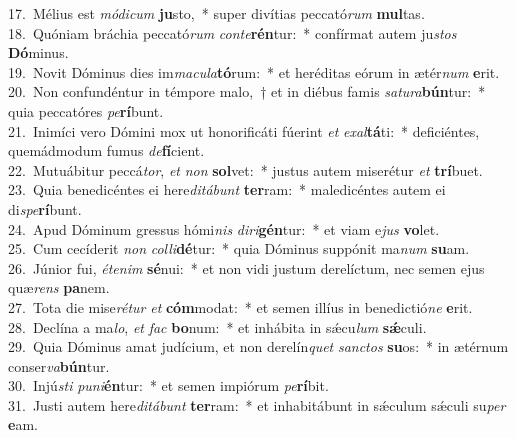 {17.~}Mélius est \textit{mó}\textit{di}\textit{cum} \textbf{ju}sto,~* super divítias peccató\textit{rum} \textbf{mul}tas.\\
{18.~}Quóniam bráchia peccató\textit{rum} \textit{con}\textit{te}\textbf{rén}tur:~* confírmat autem ju\textit{stos} \textbf{Dó}minus.\\
{19.~}Novit Dóminus dies im\textit{ma}\textit{cu}\textit{la}\textbf{tó}rum:~* et heréditas eórum in ætér\textit{num} \textbf{e}rit.\\
{20.~}Non confundéntur in témpore malo,~† et in diébus famis \textit{sa}\textit{tu}\textit{ra}\textbf{bún}tur:~* quia peccatóres \textit{pe}\textbf{rí}bunt.\\
{21.~}Inimíci vero Dómini mox ut honorificáti fúerint \textit{et} \textit{e}\textit{xal}\textbf{tá}ti:~* deficiéntes, quemádmodum fumus \textit{de}\textbf{fí}cient.\\
{22.~}Mutuábitur peccá\textit{tor}, \textit{et} \textit{non} \textbf{sol}vet:~* justus autem miserétur \textit{et} \textbf{trí}buet.\\
{23.~}Quia benedicéntes ei here\textit{di}\textit{tá}\textit{bunt} \textbf{ter}ram:~* maledicéntes autem ei di\textit{spe}\textbf{rí}bunt.\\
{24.~}Apud Dóminum gressus hómi\textit{nis} \textit{di}\textit{ri}\textbf{gén}tur:~* et viam e\textit{jus} \textbf{vo}let.\\
{25.~}Cum cecíderit \textit{non} \textit{col}\textit{li}\textbf{dé}tur:~* quia Dóminus suppónit ma\textit{num} \textbf{su}am.\\
{26.~}Júnior fui, \textit{é}\textit{te}\textit{nim} \textbf{sé}nui:~* et non vidi justum derelíctum, nec semen ejus quæ\textit{rens} \textbf{pa}nem.\\
{27.~}Tota die mise\textit{ré}\textit{tur} \textit{et} \textbf{cóm}modat:~* et semen illíus in benedictió\textit{ne} \textbf{e}rit.\\
{28.~}Declína a ma\textit{lo}, \textit{et} \textit{fac} \textbf{bo}num:~* et inhábita in sǽcu\textit{lum} \textbf{sǽ}culi.\\
{29.~}Quia Dóminus amat judícium, et non derelín\textit{quet} \textit{san}\textit{ctos} \textbf{su}os:~* in ætérnum conser\textit{va}\textbf{bún}tur.\\
{30.~}Injú\textit{sti} \textit{pu}\textit{ni}\textbf{én}tur:~* et semen impiórum \textit{pe}\textbf{rí}bit.\\
{31.~}Justi autem here\textit{di}\textit{tá}\textit{bunt} \textbf{ter}ram:~* et inhabitábunt in sǽculum sǽculi su\textit{per} \textbf{e}am.\\
